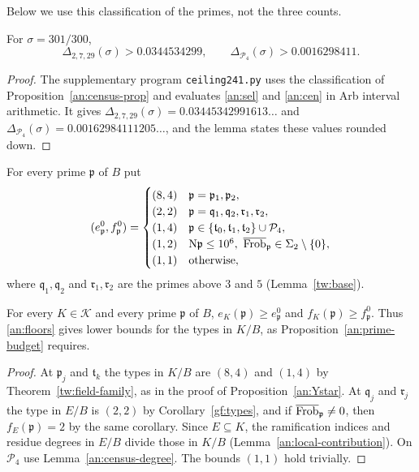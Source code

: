 Below we use this classification of the primes, not the three counts.

\begin{lemma}\label{an:corrections}
For $\sigma=301/300$,
\begin{equation}\label{an:census-values}
 \Delta_{2,7,29}(\sigma)>0.0344534299,\qquad
 \Delta_{\mathcal P_4}(\sigma)>0.0016298411.
\end{equation}
\end{lemma}

\begin{proof}
The supplementary program \texttt{ceiling241.py} uses the classification of
Proposition~\ref{an:census-prop} and evaluates \eqref{an:sel} and
\eqref{an:cen} in Arb interval arithmetic. It gives
$\Delta_{2,7,29}(\sigma)=0.03445342991613\ldots$ and
$\Delta_{\mathcal P_4}(\sigma)=0.00162984111205\ldots$, and the lemma states
these values rounded down.
\end{proof}

For every prime $\mathfrak p$ of $B$ put
\begin{equation}\label{an:floors}
 (e^0_{\mathfrak p},f^0_{\mathfrak p})=
 \begin{cases}
 (8,4)&\mathfrak p=\mathfrak p_1,\mathfrak p_2,\\
 (2,2)&\mathfrak p=\mathfrak q_1,\mathfrak q_2,\mathfrak r_1,\mathfrak r_2,\\
 (1,4)&\mathfrak p\in\{\mathfrak t_0,\mathfrak t_1,\mathfrak t_2\}\cup\mathcal P_4,\\
 (1,2)&\mathrm N\mathfrak p\le10^6,\ \overline{\operatorname{Frob}}_{\mathfrak p}\in\Sigma_2\setminus\{0\},\\
 (1,1)&\text{otherwise},
 \end{cases}
\end{equation}
where $\mathfrak q_1,\mathfrak q_2$ and $\mathfrak r_1,\mathfrak r_2$ are the
primes above $3$ and $5$ (Lemma~\ref{tw:base}).

\begin{lemma}\label{an:floors-valid}
For every $K\in\mathcal K$ and every prime $\mathfrak p$ of $B$,
$e_K(\mathfrak p)\ge e^0_{\mathfrak p}$ and
$f_K(\mathfrak p)\ge f^0_{\mathfrak p}$. Thus \eqref{an:floors} gives lower
bounds for the types in $K/B$, as Proposition~\ref{an:prime-budget}
requires.
\end{lemma}

\begin{proof}
At $\mathfrak p_j$ and $\mathfrak t_k$ the types in $K/B$ are $(8,4)$ and
$(1,4)$ by Theorem~\ref{tw:field-family}, as in the proof of
Proposition~\ref{an:Ystar}. At $\mathfrak q_j$ and $\mathfrak r_j$ the type
in $E/B$ is $(2,2)$ by Corollary~\ref{gf:types}, and if
$\overline{\operatorname{Frob}}_{\mathfrak p}\ne0$, then $f_E(\mathfrak p)=2$ by the same corollary.
Since $E\subseteq K$, the ramification indices and residue degrees in $E/B$
divide those in $K/B$ (Lemma~\ref{an:local-contribution}). On
$\mathcal P_4$ use Lemma~\ref{an:census-degree}. The bounds $(1,1)$ hold
trivially.
\end{proof}

